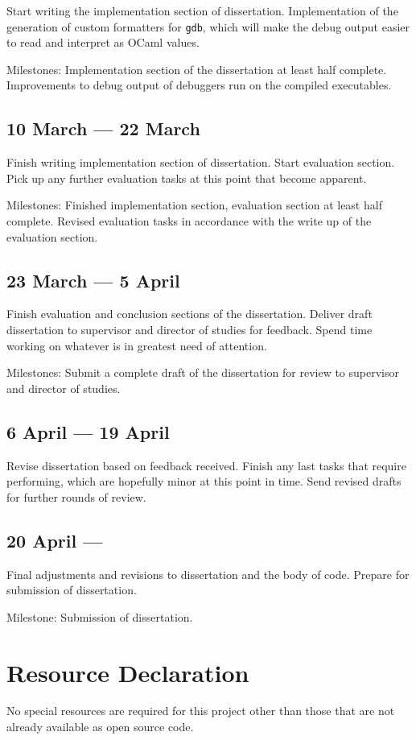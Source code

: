 Start writing the implementation section of dissertation. Implementation of the
generation of custom formatters for \texttt{gdb}, which will make the debug
output easier to read and interpret as OCaml values.

Milestones: Implementation section of the dissertation at least half complete.
Improvements to debug output of debuggers run on the compiled executables.

\subsection*{10 March --- 22 March}

Finish writing implementation section of dissertation. Start evaluation
section. Pick up any further evaluation tasks at this point that become
apparent.

Milestones: Finished implementation section, evaluation section at least half
complete. Revised evaluation tasks in accordance with the write up of the
evaluation section.

\subsection*{23 March --- 5 April}

Finish evaluation and conclusion sections of the dissertation. Deliver draft
dissertation to supervisor and director of studies for feedback. Spend time
working on whatever is in greatest need of attention.

Milestones: Submit a complete draft of the dissertation for review to
supervisor and director of studies.

\subsection*{6 April --- 19 April}

Revise dissertation based on feedback received. Finish any last tasks that
require performing, which are hopefully minor at this point in time. Send
revised drafts for further rounds of review.

\subsection*{20 April ---}

Final adjustments and revisions to dissertation and the body of code. Prepare
for submission of dissertation.

Milestone: Submission of dissertation.

\newpage

\section*{Resource Declaration}

No special resources are required for this project other than those that are
not already available as open source code.
